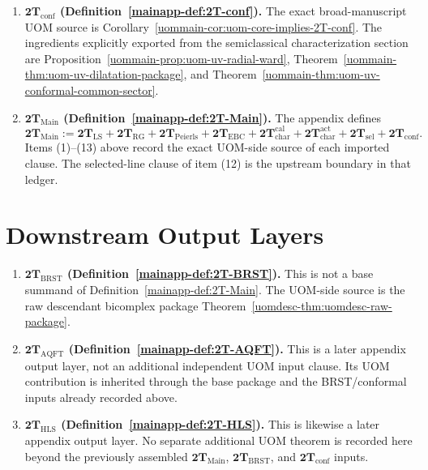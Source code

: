 \documentclass[11pt]{article}
\theoremstyle{definition}
\theoremstyle{plain}
\theoremstyle{remark}
\begin{document}
\begin{enumerate}[leftmargin=2em]
\item \textbf{\(\mathbf{2T}_{\mathrm{conf}}\) \textnormal{(Definition~\ref*{mainapp-def:2T-conf})}.}
  The exact broad-manuscript UOM source is Corollary~\ref*{uommain-cor:uom-core-implies-2T-conf}.
  The ingredients explicitly exported from the semiclassical characterization section are
  Proposition~\ref*{uommain-prop:uom-uv-radial-ward},
  Theorem~\ref*{uommain-thm:uom-uv-dilatation-package}, and
  Theorem~\ref*{uommain-thm:uom-uv-conformal-common-sector}.

\item \textbf{\(\mathbf{2T}_{\mathrm{Main}}\) \textnormal{(Definition~\ref*{mainapp-def:2T-Main})}.}
  The appendix defines
  \[
  \mathbf{2T}_{\mathrm{Main}}
  := 
  \mathbf{2T}_{\mathrm{LS}}
  + \mathbf{2T}_{\mathrm{RG}}
  + \mathbf{2T}_{\mathrm{Peierls}}
  + \mathbf{2T}_{\mathrm{EBC}}
  + \mathbf{2T}_{\mathrm{char}}^{\mathrm{cal}}
  + \mathbf{2T}_{\mathrm{char}}^{\mathrm{act}}
  + \mathbf{2T}_{\mathrm{sel}}
  + \mathbf{2T}_{\mathrm{conf}}.
  \]
  Items \textup{(1)}--\textup{(13)} above record the exact UOM-side source of each imported clause.
  The selected-line clause of item \textup{(12)} is the upstream boundary in that ledger.
\end{enumerate}

\section{Downstream Output Layers}

\begin{enumerate}[leftmargin=2em]
\item \textbf{\(\mathbf{2T}_{\mathrm{BRST}}\) \textnormal{(Definition~\ref*{mainapp-def:2T-BRST})}.}
  This is not a base summand of Definition~\ref*{mainapp-def:2T-Main}.
  The UOM-side source is the raw descendant bicomplex package
  Theorem~\ref*{uomdesc-thm:uomdesc-raw-package}.

\item \textbf{\(\mathbf{2T}_{\mathrm{AQFT}}\) \textnormal{(Definition~\ref*{mainapp-def:2T-AQFT})}.}
  This is a later appendix output layer, not an additional independent UOM input clause.
  Its UOM contribution is inherited through the base package and the BRST/conformal inputs already recorded above.

\item \textbf{\(\mathbf{2T}_{\mathrm{HLS}}\) \textnormal{(Definition~\ref*{mainapp-def:2T-HLS})}.}
  This is likewise a later appendix output layer.
  No separate additional UOM theorem is recorded here beyond the previously assembled
  \(\mathbf{2T}_{\mathrm{Main}}\), \(\mathbf{2T}_{\mathrm{BRST}}\), and
  \(\mathbf{2T}_{\mathrm{conf}}\) inputs.
\end{enumerate}
\end{document}
